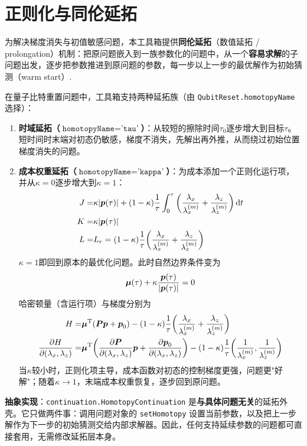 \documentclass[UTF8]{article}
\numberwithin{equation}{section}
\begin{document}
    \section{正则化与同伦延拓}\label{sec:prolong}
        为解决梯度消失与初值敏感问题，本工具箱提供\textbf{同伦延拓}（数值延拓 / prolongation）机制：把原问题嵌入到一族参数化的问题中，从一个\textbf{容易求解}的子问题出发，逐步把参数推进到原问题的参数，每一步以上一步的最优解作为初始猜测（warm start）.
        \par
        在量子比特重置问题中，工具箱支持两种延拓族（由 \texttt{QubitReset.homotopyName} 选择）：
        \begin{enumerate}
            \item \textbf{时域延拓（$\texttt{homotopyName}=\texttt{'tau'}$）}：从较短的擦除时间$\tau_0$逐步增大到目标$\tau$。短时间时末端对初态仍敏感，梯度不消失，先解出再外推，从而绕过初始位置梯度消失的问题。
            \item \textbf{成本权重延拓（$\texttt{homotopyName}=\texttt{'kappa'}$）}：为成本添加一个正则化运行项，并从$\kappa=0$逐步增大到$\kappa=1$：
            \begin{align}
                J=&\kappa\abs{\vb*{p}\pqty{\tau}}+\pqty{1-\kappa}\frac{1}{\tau}\int_{0}^{\tau}\pqty{\frac{\lambda_x}{\lambda_x^\pqty{m}}+\frac{\lambda_z}{\lambda_z^\pqty{m}}}\dd{t}\\
                K=&\kappa\abs{\vb*{p}\pqty{\tau}}\\
                L=&L_r=\pqty{1-\kappa}\frac{1}{\tau}\pqty{\frac{\lambda_x}{\lambda_x^\pqty{m}}+\frac{\lambda_z}{\lambda_z^\pqty{m}}}
            \end{align}
            $\kappa=1$即回到原本的最优化问题。此时自然边界条件变为
            \begin{align}
                \vb*{\mu}\pqty{\tau}+\kappa\frac{\vb*{p}\pqty{\tau}}{\abs{\vb*{p}\pqty{\tau}}}=0
            \end{align}
            哈密顿量（含运行项）与梯度分别为
            \begin{align}
                H=&\vb*{\mu}^\text{T}\pqty{\vb*{P}\vb*{p}+\vb*{p}_0}-\pqty{1-\kappa}\frac{1}{\tau}\pqty{\frac{\lambda_x}{\lambda_x^\pqty{m}}+\frac{\lambda_z}{\lambda_z^\pqty{m}}}\\
                \pdv{H}{\pqty{\lambda_x,\lambda_z}}=&\vb*{\mu}^\text{T}\pqty{\pdv{\vb*{P}}{\pqty{\lambda_x,\lambda_z}}\vb*{p}+\pdv{\vb*{p}_0}{\pqty{\lambda_x,\lambda_z}}}-\pqty{1-\kappa}\frac{1}{\tau}\pqty{\frac{1}{\lambda_x^\pqty{m}},\frac{1}{\lambda_z^\pqty{m}}}
            \end{align}
            当$\kappa$较小时，正则化项主导，成本函数对初态的控制梯度更强，问题更"好解"；随着$\kappa\to1$，末端成本权重恢复，逐步回到原问题。
        \end{enumerate}
        \par
        \textbf{抽象实现}：\texttt{continuation.HomotopyContinuation} 是\textbf{与具体问题无关}的延拓外壳。它只做两件事：调用问题对象的 \texttt{setHomotopy} 设置当前参数，以及把上一步解作为下一步的初始猜测交给内部求解器。因此，任何支持延续参数的问题都可直接套用，无需修改延拓层本身。
\end{document}
